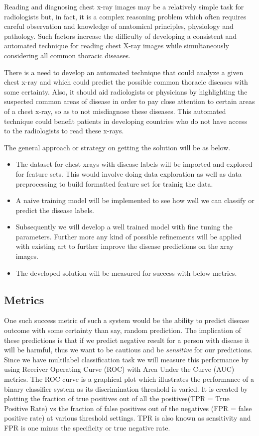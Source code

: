 \documentclass{article}
\begin{document}
    Reading and diagnosing chest x-ray images may be a relatively simple task for radiologists but, in fact, it is a complex reasoning problem which often requires careful observation and knowledge of anatomical principles, physiology and pathology. Such factors increase the difficulty of developing a consistent and automated technique for reading chest X-ray images while simultaneously considering all common thoracic diseases.\cite{nih-gov-xray-release}

    There is a need to develop an automated technique that could analyze a given chest x-ray and which could predict the possible common thoracic diseases with some certainty. Also, it should aid radiologists or physicians by highlighting the suspected common areas of disease in order to pay close attention to certain areas of a chest x-ray, so as to not misdiagnose these diseases. This automated technique could benefit patients in developing countries who do not have access to the radiologists to read these x-rays.

    The general approach or strategy on getting the solution will be as below.
    \begin{itemize}
        \item The dataset for chest xrays with disease labels will be imported and explored for feature sets. This would involve doing data exploration as well as data preprocessing to build formatted feature set for trainig the data.
        \item A naive training model will be implemented to see how well we can classify or predict the disease labels. 
        \item Subsequently we will develop a well trained model with fine tuning the parameters. Further more any kind of possible refinements will be applied with existing art to further improve the disease predictions on the xray images.
        \item The developed solution will be measured for success with below metrics.
    \end{itemize}

    \subsection{Metrics}
    One such success metric of such a system would be the ability to predict disease outcome with some certainty than say, random prediction. The implication of these predictions is that if we predict negative result for a person with disease it will be harmful, thus we want to be cautious and be \textit{sensitive} for our predictions. Since we have multilabel classification task we will measure this performance by using Receiver Operating Curve (ROC) with Area Under the Curve (AUC) metrics. The ROC curve is a graphical plot which illustrates the performance of a binary classifier system as its discrimination threshold is varied. It is created by plotting the fraction of true positives out of all the positives(TPR = True Positive Rate) vs the fraction of false positives out of the negatives (FPR = false positive rate) at various threshold settings. TPR is also known as sensitivity and FPR is one minus the specificity or true negative rate.\cite{roc-metric}\cite{auc}
\end{document}
